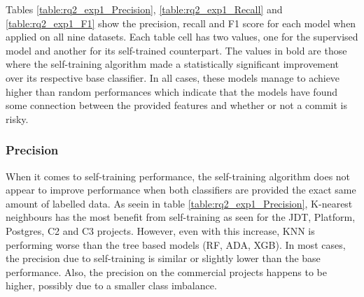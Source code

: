 \documentclass[../main.tex]{subfiles}
\begin{document}
Tables \ref{table:rq2_exp1_Precision}, \ref{table:rq2_exp1_Recall} and \ref{table:rq2_exp1_F1} show the precision, recall and F1 score for each model when applied on all nine datasets. Each table cell has two values, one for the supervised model and another for its self-trained counterpart. The values in bold are those where the self-training algorithm made a statistically significant improvement over its respective base classifier. In all cases, these models manage to achieve higher than random performances which indicate that the models have found some connection between the provided features and whether or not a commit is risky. 

\subsubsection{Precision}

When it comes to self-training performance, the self-training algorithm does not appear to improve performance when both classifiers are provided the exact same amount of labelled data. As seein in table \ref{table:rq2_exp1_Precision}, K-nearest neighbours has the most benefit from self-training as seen for the JDT, Platform, Postgres, C2 and C3 projects. However, even with this increase, KNN is performing worse than the tree based models (RF, ADA, XGB). In most cases, the precision due to self-training is similar or slightly lower than the base performance. Also, the precision on the commercial projects happens to be higher, possibly due to a smaller class imbalance.
\end{document}
